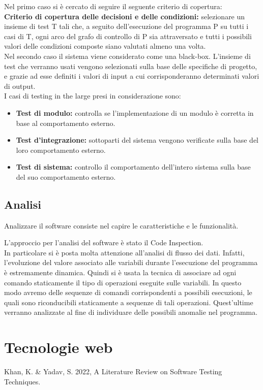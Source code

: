 \documentclass[a4paper,final,12pt]{report}
\begin{document}
Nel primo caso si è cercato di seguire il seguente criterio di copertura:\\
\textbf{Criterio di copertura delle decisioni e delle condizioni:} selezionare un insieme di test T tali che, a seguito dell’esecuzione del programma P su tutti i casi di T, ogni arco del grafo di controllo di P sia attraversato e tutti i possibili valori delle condizioni composte siano valutati almeno una volta.
\\
Nel secondo caso il sistema viene considerato come una black-box. L'insieme di test che verranno usati vengono selezionati sulla base delle specifiche di progetto, e grazie ad esse definiti i valori di input a cui corrisponderanno determinati valori di output.\\
I casi di testing in the large presi in considerazione sono:
\begin{itemize}
\item \textbf{Test di modulo:} controlla se l'implementazione di un modulo è corretta in base al comportamento esterno.
\item \textbf{Test d'integrazione:} sottoparti del sistema vengono verificate sulla base del loro comportamento esterno.
\item \textbf{Test di sistema:} controllo il comportamento dell'intero sistema sulla  base del suo comportamento esterno. 
\end{itemize}

\subsection{Analisi}
Analizzare il software consiste nel capire le caratteristiche e le funzionalità.

L'approccio per l'analisi del software è stato il Code Inspection.\\
In particolare si è posta molta attenzione all'analisi di flusso dei dati.
Infatti, l'evoluzione del valore associato alle variabili durante l'esecuzione del programma è estremamente dinamica. Quindi si è usata la tecnica di associare ad ogni comando staticamente il tipo di operazioni eseguite sulle variabili. In questo modo avremo delle sequenze di comandi corrispondenti a possibili esecuzioni, le quali sono riconducibili staticamente a sequenze di tali operazioni. Quest'ultime verranno analizzate al fine di individuare delle possibili anomalie nel programma.

\section{Tecnologie web}



\begin{thebibliography}{100}
 Khan, K. \& Yadav, S. 2022, A Literature Review on Software Testing Techniques.
\end{thebibliography}
\end{document}
